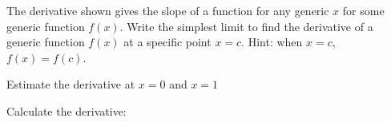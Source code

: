 \documentclass[11pt]{exam}
\begin{document}
	\begin{questions}
		\addpoints
		\question[15] The derivative shown gives the slope of a function for any generic $x$ for some generic function $f(x)$. Write the simplest limit to find the derivative of a generic function $f(x)$ at a specific point $x=c$. Hint: when $x=c$, $f(x)=f(c)$.
		
		\newpage
		\addpoints
		\question[5] Estimate the derivative at $x=0$ and $x=1$
		\begin{center}
		\end{center}
		\newpage\addpoints
		\question[15] Calculate the derivative:
		\noaddpoints 
\end{questions}
\end{document}
